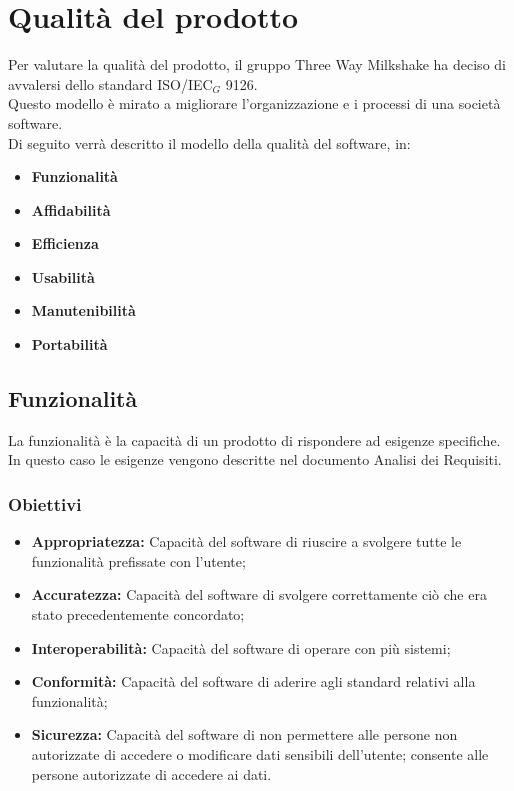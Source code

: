 \section{Qualità del prodotto}
Per valutare  la qualità del prodotto, il gruppo Three Way Milkshake ha deciso di avvalersi dello standard ISO/IEC$_G$ 9126.\\
Questo modello è mirato a  migliorare l'organizzazione e i processi di una società software.\\
Di seguito verrà descritto il modello della qualità del software, in:
\begin{itemize}
	\item \textbf{Funzionalità}
	\item \textbf{Affidabilità}
	\item \textbf{Efficienza}
	\item \textbf{Usabilità}
	\item \textbf{Manutenibilità}
	\item \textbf{Portabilità}
\end{itemize}

\subsection{Funzionalità}
La funzionalità è la capacità di un prodotto di rispondere ad esigenze specifiche.\\
In questo caso le esigenze vengono descritte nel documento Analisi dei Requisiti.
\subsubsection{Obiettivi}
\begin{itemize}
	\item \textbf{Appropriatezza:} Capacità del software di riuscire a svolgere tutte le funzionalità prefissate con l'utente;
	\item \textbf{Accuratezza:} Capacità del software di svolgere correttamente ciò che era stato precedentemente concordato;
	\item \textbf{Interoperabilità:} Capacità del software di operare con più sistemi;
	\item \textbf{Conformità:} Capacità del software di aderire agli standard relativi alla funzionalità;
	\item \textbf{Sicurezza:} Capacità del software di non permettere alle persone non autorizzate di accedere o modificare dati sensibili dell'utente; consente alle persone autorizzate di accedere ai dati.
\end{itemize}

